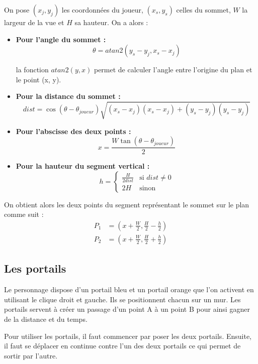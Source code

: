 \documentclass[11pt]{article}
\begin{document}
On pose $(x_j, y_j)$ les coordonnées du joueur,  $(x_s, y_s)$ celles du sommet, $W$ la largeur de la
vue et $H$ sa hauteur. On a alors : \\
\begin{itemize}
	\item[] \textbf{Pour l'angle du sommet : } \\
	\[
		\theta = atan2(y_s - y_j, x_s - x_j)
	\]

	la fonction $atan2(y, x)$ permet de calculer l'angle entre l'origine du plan et le point (x, y).

	\item[] \textbf{Pour la distance du sommet : } \\
	\[
		dist = \cos(\theta - \theta_{joueur})\sqrt{(x_s - x_j)(x_s - x_j) + (y_s - y_j)(y_s - y_j)}
	\]
	
	\item[] \textbf{Pour l'abscisse des deux points : } \\
	\[
		x = \frac{W\tan(\theta -  \theta_{joueur})}{2}
	\]

	\item[] \textbf{Pour la hauteur du segment vertical : } \\ 
	\[
		h = 
		\begin{cases}
			\frac{H}{2dist} & \text{si } dist \neq 0 \\
			2H & \text{sinon }
		\end{cases}
	\]
\end{itemize}

On obtient alors les deux points du segment représentant le sommet sur le plan comme suit :
\begin{align*}
    P_1 &= (x + \frac{W}{2}, \frac{H}{2} - \frac{h}{2}) \\
	P_2 &= (x + \frac{W}{2}, \frac{H}{2} + \frac{h}{2})
\end{align*}


\subsection{Les portails}

Le personnage dispose d’un portail bleu et un portail orange que l’on activent en utilisant le clique droit et gauche.
Ils se positionnent chacun sur un mur.
Les portails servent à créer un passage d’un point A à un point B pour ainsi gagner de la distance et du temps.

Pour utiliser les portails, il faut commencer par poser les deux portails.
Ensuite, il faut se déplacer en continue contre l’un des deux portails ce qui permet de sortir par l’autre.
\end{document}
